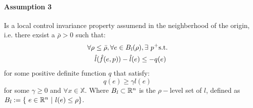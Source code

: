 \paragraph{Assumption 3} Is a local control invariance property assumend in the neighberhood of the origin, i.e. there exsist a $\bar{\rho} > 0$ such that:
\begin{equation}
	\begin{split}
		\forall \rho &\leq \bar{\rho}, \forall e \in B_{\it{l}}(\rho),\exists\ p^+\textnormal{s.t.} \\
		&\hat{l}(\hat{f}(e,p))-\hat{l}(e) \leq -q(e) \\
		\label{ass3}
	\end{split}
\end{equation}
for some positive definite function $q$ that satisfy:
\begin{equation}
	q(e) \ge \gamma l(e)
	\label{ass3} 
\end{equation}
for some $\gamma \geq 0$ and $\forall x \in \mathbb{X}$.
Where $B_{\it{l}} \subset \mathbb{R}^n$ is the $\rho-$level set of $l$, defined as $B_{\it{l}} := \lbrace\ e \in \mathbb{R}^n\ |\ l(e) \leq \rho \rbrace$.

